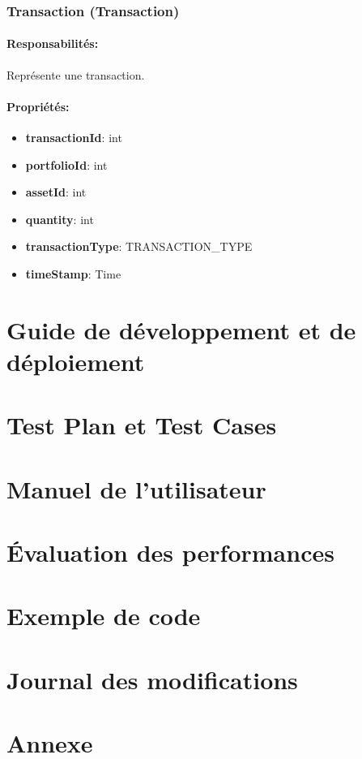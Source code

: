 \documentclass{article}
\begin{document}
\subsubsection{Transaction (Transaction)}
\paragraph{Responsabilités:} Représente une transaction.
\paragraph{Propriétés:}
\begin{itemize}
  \item \textbf{transactionId}: int
  \item \textbf{portfolioId}: int
  \item \textbf{assetId}: int
  \item \textbf{quantity}: int
  \item \textbf{transactionType}: TRANSACTION\_TYPE
  \item \textbf{timeStamp}: Time
\end{itemize}
\section{Guide de développement et de déploiement}
\section{Test Plan et Test Cases}
\section{Manuel de l'utilisateur}
\section{Évaluation des performances}
\section{Exemple de code}
\section{Journal des modifications}
\section{Annexe}
\end{document}

